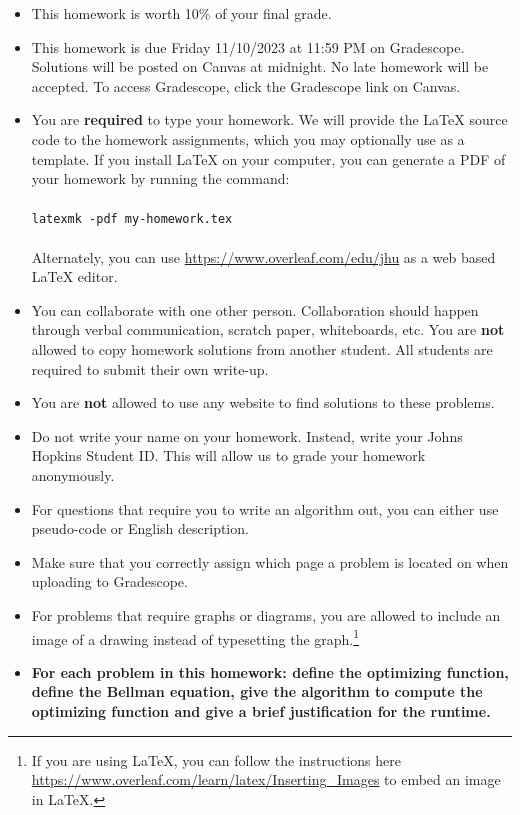 \documentclass[letter,11pt]{article}
\begin{document}
\begin{itemize}
\item This homework is worth 10\% of your final grade.

\item This homework is due Friday 11/10/2023 at 11:59 PM on Gradescope.  Solutions will be posted on Canvas at midnight.  No late homework will be accepted.  To access Gradescope, click the Gradescope link on Canvas.

\item You are \textbf{required} to type your homework.  We will
  provide the \LaTeX{} source code to the homework assignments, which you may
  optionally use as a template.  If you install \LaTeX{} on your computer, you can
  generate a PDF of
  your homework by running the command: \\
  \\
  \texttt{latexmk~-pdf~my-homework.tex} \\
  \\
  Alternately, you can use \url{https://www.overleaf.com/edu/jhu} as a web based
  \LaTeX{} editor.

\item You can collaborate with one other person.
    Collaboration should happen through verbal communication, scratch paper,
    whiteboards, etc.  You are \textbf{not} allowed to copy homework
    solutions from another student.  All students are required to submit their
    own write-up.

\item You are \textbf{not} allowed to use any website to find solutions to these problems.

\item Do not write your name on your homework. Instead, write your Johns Hopkins Student ID.  This will allow us to grade your homework anonymously.

\item For questions that require you to write an algorithm out, you can either use pseudo-code or English description.

\item Make sure that you correctly assign which page a problem is located on when uploading to Gradescope.

\item For problems that require graphs or diagrams, you are allowed to include an image of a drawing instead of typesetting the graph.\footnote{If you are using LaTeX, you can follow the instructions here \url{https://www.overleaf.com/learn/latex/Inserting_Images} to embed an image in LaTeX.}

\item \textbf{For each problem in this homework: define the optimizing function, define the Bellman equation, give the algorithm to compute the optimizing function and give a brief justification for the runtime.}
\end{itemize}
\end{document}
